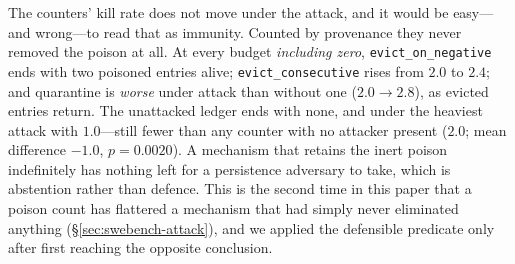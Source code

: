The counters' kill rate does not move under the attack, and it would be
easy---and wrong---to read that as immunity. Counted by provenance they
never removed the poison at all. At every budget \emph{including zero},
\texttt{evict\_on\_negative} ends with two poisoned entries alive;
\texttt{evict\_consecutive} rises from $2.0$ to $2.4$; and quarantine is
\emph{worse} under attack than without one ($2.0 \rightarrow 2.8$), as
evicted entries return. The unattacked ledger ends with none, and under
the heaviest attack with $1.0$---still fewer than any counter with no
attacker present ($2.0$; mean difference $-1.0$, $p = 0.0020$). A
mechanism that retains the inert poison indefinitely has nothing left for
a persistence adversary to take, which is abstention rather than defence.
This is the second time in this paper that a poison count has flattered a
mechanism that had simply never eliminated anything
(\S\ref{sec:swebench-attack}), and we applied the defensible predicate
only after first reaching the opposite conclusion. 